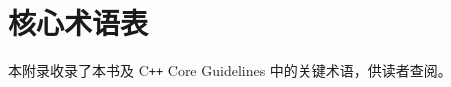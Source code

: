 \documentclass[12pt,a4paper,fontset=fandol]{ctexbook}
\begin{document}
\mainmatter





\appendix

\chapter{核心术语表}

本附录收录了本书及 C\texttt{++} Core Guidelines 中的关键术语，供读者查阅。
\end{document}
